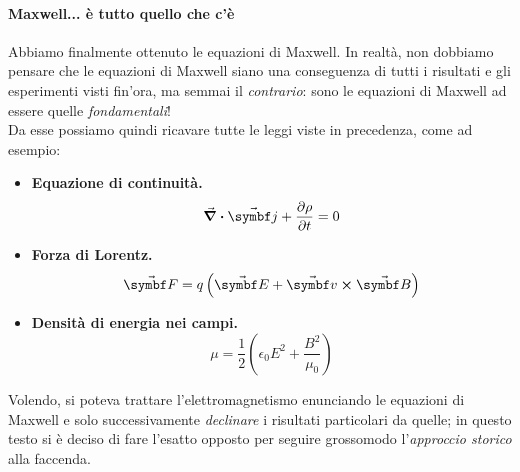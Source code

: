 \paragraph{Maxwell... è tutto quello che c'è}
Abbiamo finalmente ottenuto le equazioni di Maxwell. In realtà, non dobbiamo pensare che le equazioni di Maxwell siano una conseguenza di tutti i risultati e gli esperimenti visti fin'ora, ma semmai il \textit{contrario}: sono le equazioni di Maxwell ad essere quelle \textit{fondamentali}!\\
Da esse possiamo quindi ricavare tutte le leggi viste in precedenza, come ad esempio:
\begin{itemize}
	\item \textbf{Equazione di continuità.}
	\begin{equation}
		\div{\vba{j}}+\pdv{\rho}{t}=0
	\end{equation}
	\item \textbf{Forza di Lorentz.}
	\begin{equation}
		\vba{F}=q\left(\vba{E}+\vba{v}\cross\vba{B}\right)
	\end{equation}
	\item \textbf{Densità di energia nei campi.}
	\begin{equation}
		\mu=\frac{1}{2}\left(\epsilon_0E^2+\frac{B^2}{\mu_0}\right)
	\end{equation}
\end{itemize}
Volendo, si poteva trattare l'elettromagnetismo enunciando le equazioni di Maxwell e solo successivamente \textit{declinare} i risultati particolari da quelle; in questo testo si è deciso di fare l'esatto opposto per seguire grossomodo l'\textit{approccio storico} alla faccenda.
